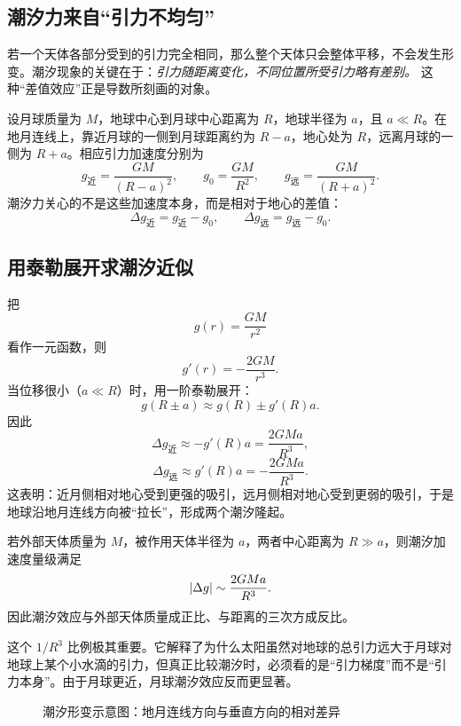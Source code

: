 \subsection{潮汐力来自“引力不均匀”}

若一个天体各部分受到的引力完全相同，那么整个天体只会整体平移，不会发生形变。潮汐现象的关键在于：\emph{引力随距离变化，不同位置所受引力略有差别。} 这种“差值效应”正是导数所刻画的对象。

设月球质量为 $M$，地球中心到月球中心距离为 $R$，地球半径为 $a$，且 $a\ll R$。在地月连线上，靠近月球的一侧到月球距离约为 $R-a$，地心处为 $R$，远离月球的一侧为 $R+a$。相应引力加速度分别为
\[
g_{\text{近}}=\frac{GM}{(R-a)^2},\qquad g_0=\frac{GM}{R^2},\qquad g_{\text{远}}=\frac{GM}{(R+a)^2}.
\]
潮汐力关心的不是这些加速度本身，而是相对于地心的差值：
\[
\Delta g_{\text{近}}=g_{\text{近}}-g_0,\qquad \Delta g_{\text{远}}=g_{\text{远}}-g_0.
\]

\subsection{用泰勒展开求潮汐近似}

把
\[
g(r)=\frac{GM}{r^2}
\]
看作一元函数，则
\[
g'(r)=-\frac{2GM}{r^3}.
\]
当位移很小（$a\ll R$）时，用一阶泰勒展开：
\[
g(R\pm a)\approx g(R)\pm g'(R)a.
\]
因此
\[
\Delta g_{\text{近}}\approx -g'(R)a=\frac{2GMa}{R^3},
\]
\[
\Delta g_{\text{远}}\approx g'(R)a=-\frac{2GMa}{R^3}.
\]
这表明：近月侧相对地心受到更强的吸引，远月侧相对地心受到更弱的吸引，于是地球沿地月连线方向被“拉长”，形成两个潮汐隆起。

\begin{theorem}[潮汐加速度的量级]
若外部天体质量为 $M$，被作用天体半径为 $a$，两者中心距离为 $R\gg a$，则潮汐加速度量级满足
\[
\abs{\Delta g}\sim \frac{2GMa}{R^3}.
\]
因此潮汐效应与外部天体质量成正比、与距离的三次方成反比。
\end{theorem}

这个 $1/R^3$ 比例极其重要。它解释了为什么太阳虽然对地球的总引力远大于月球对地球上某个小水滴的引力，但真正比较潮汐时，必须看的是“引力梯度”而不是“引力本身”。由于月球更近，月球潮汐效应反而更显著。

\begin{figure}[H]
\centering
{}
\caption{潮汐形变示意图：地月连线方向与垂直方向的相对差异}
\end{figure}

